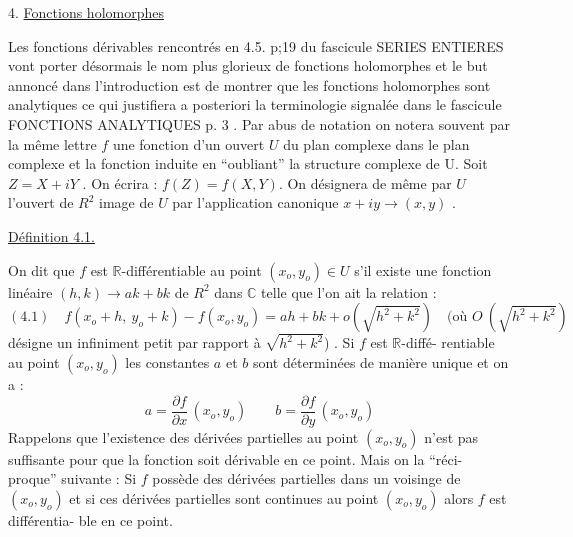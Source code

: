 
4. \uline{Fonctions holomorphes}

Les fonctions dérivables rencontrés en 4.5. p;19 du fascicule
SERIES ENTIERES vont porter désormais le nom plus glorieux de fonctions
holomorphes et le but annoncé dans l'introduction est de montrer que les
fonctions holomorphes sont analytiques ce qui justifiera a posteriori la
terminologie signalée dans le fascicule FONCTIONS ANALYTIQUES p. 3 .
Par abus de notation on notera souvent par la même lettre $f$ une fonction
d'un ouvert $U$ du plan complexe dans le plan complexe et la fonction induite
en ``oubliant'' la structure complexe de U. Soit $Z = X+iY$ . On écrira :
$f(Z) = f(X,Y)$. On désignera de même par $U$ l'ouvert de $R^{2}$ image de $U$ par
l'application canonique $x+iy \rightarrow (x,y)$ .

\uline{Définition 4.1.}

On dit que $f$ est $\mathbb{R}$-différentiable au point $(x_{o},y_{o}) \in U$ s'il
existe une fonction linéaire $(h,k) \rightarrow ak + bk$ de $R^{2}$ dans $\mathbb{C}$ telle que l'on
ait la relation :
\[ (4.1) \quad f(x_{o}+h,\ y_{o}+k) - f(x_{o},y_{o}) = ah + bk + o(\sqrt{h^{2}+k^{2}}) \quad (\text{où } O\ (\sqrt{h^{2}+k^{2}}) \]
désigne un infiniment petit par rapport à $\sqrt{h^{2}+k^{2}}$) . Si $f$ est $\mathbb{R}$-diffé-%
rentiable au point $(x_{o},y_{o})$ les constantes $a$ et $b$ sont déterminées de manière
unique et on a :
\[ a = \frac{\partial f}{\partial x}\,(x_{o},y_{o}) \qquad b = \frac{\partial f}{\partial y}\,(x_{o},y_{o}) \]
Rappelons que l'existence des dérivées partielles au point $(x_{o},y_{o})$ n'est pas
suffisante pour que la fonction soit dérivable en ce point. Mais on  la ``réci-%
proque'' suivante :
Si $f$ possède des dérivées partielles dans un voisinge de $(x_{o},y_{o})$ et si ces
dérivées partielles sont continues au point $(x_{o},y_{o})$ alors $f$ est différentia-%
ble en ce point.


